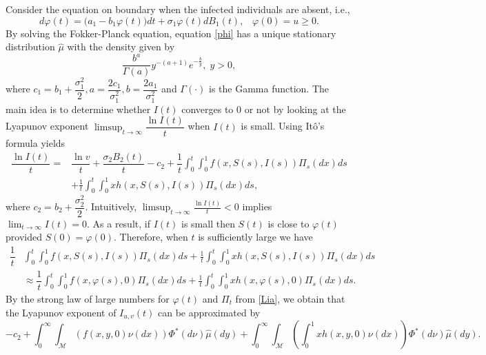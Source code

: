 \documentclass[12pt]{amsart}
\theoremstyle{remark}
\numberwithin{equation}{section}
\newcommand{\M}{\mathcal{M}}
\numberwithin{equation}{section}
\newcommand{\1}{\boldsymbol{1}}
\def\hat{\widehat}
\begin{document}
Consider the equation on boundary when the infected individuals are absent, i.e.,
\begin{equation}\label{phi}
d \varphi(t)=\big(a_1-b_1\varphi(t)\big)dt+\sigma_1 \varphi(t)dB_1(t),\;\;\;\varphi(0)=u\geq 0.
\end{equation}
By solving the Fokker-Planck equation,   equation \eqref{phi}  has
a unique stationary distribution $\hat\mu$ with the density  given by
\begin{equation}\label{hpp}
\dfrac{b^a}{\Gamma(a)}y^{-(a+1)}e^{-\frac{b}y},\; y>0,
\end{equation}
where $c_1=b_1+\dfrac{\sigma_1^2}{2}, a=\dfrac{2c_1}{\sigma_1^2},b=\dfrac{2a_1}{\sigma_1^2} $ and
$\Gamma(\cdot) $ is the Gamma function.
The main idea is to determine whether $I(t)$ converges to 0 or not by
looking at the Lyapunov exponent $\limsup_{t\to\infty} \dfrac{\ln I(t)}t$ when $I(t)$ is small. Using It\^{o}'s formula yields
\begin{equation}\label{Lia}
\begin{aligned}
\dfrac{\ln I(t)}{t}=&\dfrac{\ln v}{t}+ \dfrac {\sigma_2B_2(t)}t-c_2+\dfrac 1{t}\int_0^t\int_0^1f(x,S(s),I(s))\Pi_s(dx)ds\\
&+\frac 1t\int_0^t \int_0^1xh(x,S(s),I(s))\Pi_s(dx)ds,
\end{aligned}
\end{equation}
where $c_2=b_2+\dfrac{\sigma_2^2}2.$
Intuitively, $\limsup_{t\to\infty} \frac{\ln I(t)}t<0$ implies $\lim_{t\to\infty} I(t)=0$. As a result, if $I(t)$ is small then $S(t)$ is close to $\varphi(t)$ provided $S(0)=\varphi(0)$. Therefore, when $t$ is sufficiently large we have
\begin{equation*}
\begin{aligned}
\dfrac 1{t}&\int_0^t\int_0^1f(x,S(s),I(s))\Pi_s(dx)ds+\frac 1t\int_0^t \int_0^1xh(x,S(s),I(s))\Pi_s(dx)ds\\
&\approx \dfrac 1{t}\int_0^t\int_0^1f(x,\varphi(s),0)\Pi_s(dx)ds+\frac 1t\int_0^t \int_0^1xh(x,\varphi(s),0)\Pi_s(dx)ds.
\end{aligned}
\end{equation*}
By the strong law of large numbers for $\varphi(t)$ and $\Pi_t$ from \eqref{Lia}, we obtain that the Lyapunov exponent of $I_{u,v}(t)$  can be
approximated by
\begin{equation}\label{ld}
-c_2+ \int_0^{\infty}\int_{\M} \left(f(x,y,0)\nu(dx)\right)\Phi^*(d\nu)\hat\mu(dy)+\int_0^\infty\int_{\M} \left(\int_0^1 xh(x,y,0)\nu(dx)\right)\Phi^*(d\nu)\hat\mu(dy).
\end{equation}
\end{document}
